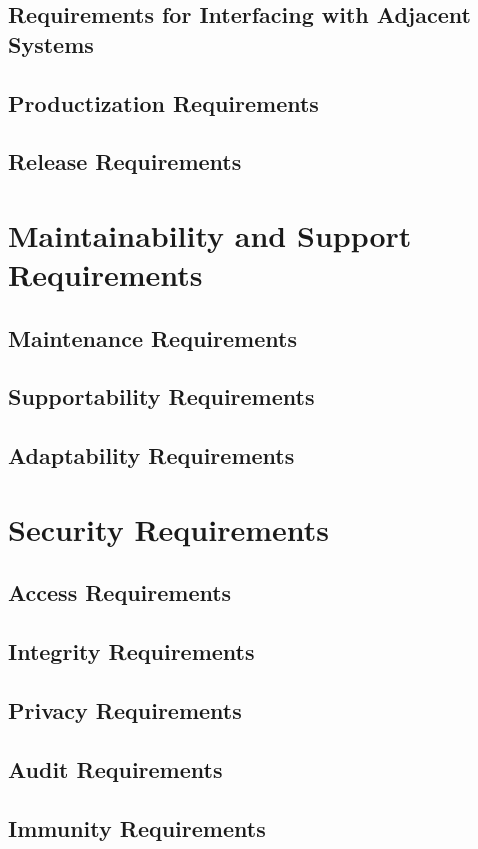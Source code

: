 \documentclass[paper=letter, fontsize=10pt]{scrartcl}
\numberwithin{equation}{section}		%
\numberwithin{figure}{section}			%
\numberwithin{table}{section}				%
\begin{document}
\subsection{Requirements for Interfacing with Adjacent Systems}
\subsection{Productization Requirements}
\subsection{Release Requirements}

\section{Maintainability and Support Requirements}
\subsection{Maintenance Requirements}
\subsection{Supportability Requirements}
\subsection{Adaptability Requirements}

\section{Security Requirements}
\subsection{Access Requirements}
\subsection{Integrity Requirements}
\subsection{Privacy Requirements}
\subsection{Audit Requirements}
\subsection{Immunity Requirements}
\end{document}
